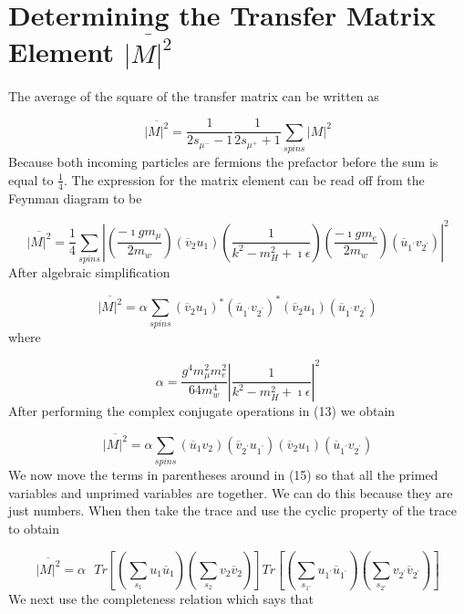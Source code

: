 \documentclass{article}
\begin{document}
\section{Determining the Transfer Matrix Element $\overline{\left|M\right|^2}$}
The average of the square of the transfer matrix can be written as

\begin{equation}
\overline{\left|M\right|^2}=\frac{1}{2s_{{\mu}^{-}}-1}\frac{1}{2s_{{\mu}^{+}}+1}\sum_{spins} \left|M\right|^2
\end{equation}
Because both incoming particles are fermions the prefactor before the sum is equal to $\frac{1}{4}$.  The expression for the matrix element can be read off from the Feynman diagram to be

\begin{equation}
\overline{\left|M\right|^2}=\frac{1}{4}\sum_{spins} \left|\left(\frac{-\imath gm_\mu}{2m_w}\right)\left(\overline{v}_2u_1\right)\left(\frac{1}{k^2-m_H^2+\imath\epsilon}\right)\left(\frac{-\imath gm_e}{2m_w}\right)\left(\overline{u}_{1^{'}}v_{2^{'}}\right)\right|^2
\end{equation}
After algebraic simplification


\begin{equation}
\overline{\left|M\right|^2}=\alpha\sum_{spins}\left(\overline{v}_2u_1\right)^*\left(\overline{u}_{1^{'}}v_{2^{'}}\right)^*\left(\overline{v}_2u_1\right)\left(\overline{u}_{1^{'}}v_{2^{'}}\right)
\end{equation}
where

\begin{equation}
\alpha=\frac{g^4m_\mu^2m_e^2}{64m_w^4}\left|\frac{1}{k^2-m_H^2+\imath\epsilon}\right|^2
\end{equation}
After performing the complex conjugate operations in (13) we obtain

\begin{equation}
\overline{\left|M\right|^2}=\alpha\sum_{spins} \left(\overline{u}_1v_2\right)\left(\overline{v}_{2^{'}}u_{1^{'}}\right)\left(\overline{v}_2u_1\right)\left(\overline{u}_{1^{'}}v_{2^{'}}\right)
\end{equation}
We now move the terms in parentheses around in (15) so that all the primed variables and unprimed variables are together.  We can do this because they are just numbers.  When then take the trace and use the cyclic property of the trace to obtain

\begin{equation}
\overline{\left|M\right|^2}=\alpha\text{  } Tr\left[\left(\sum_{s_1}u_1\overline{u}_1\right)\left(\sum_{s_2}v_2\overline{v}_2\right)\right]Tr\left[\left(\sum_{s_{1'}}u_{1^{'}}\overline{u}_{1^{'}}\right)\left(\sum_{s_{2'}}v_{2^{'}}\overline{v}_{2^{'}}\right)\right]
\end{equation}
We next use the completeness relation which says that
\end{document}
